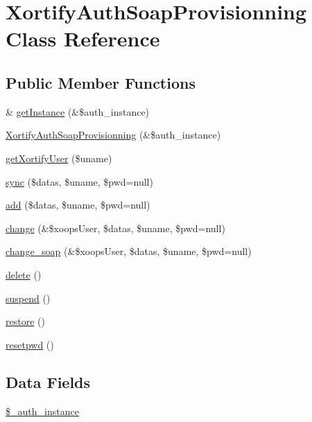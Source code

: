 \hypertarget{class_xortify_auth_soap_provisionning}{\section{Xortify\-Auth\-Soap\-Provisionning Class Reference}
\label{class_xortify_auth_soap_provisionning}
}
\subsection*{Public Member Functions}
\begin{DoxyCompactItemize}
\item 
\& \hyperlink{class_xortify_auth_soap_provisionning_a2c8eaa915c70d75289ac8a03686194f9}{get\-Instance} (\&\$auth\-\_\-instance)
\item 
\hyperlink{class_xortify_auth_soap_provisionning_a8b92f1ad88521a50ccad3531e57bafef}{Xortify\-Auth\-Soap\-Provisionning} (\&\$auth\-\_\-instance)
\item 
\hyperlink{class_xortify_auth_soap_provisionning_a041d726ac26672547ed1504e8e0117aa}{get\-Xortify\-User} (\$uname)
\item 
\hyperlink{class_xortify_auth_soap_provisionning_a35dc08b0f2138eb818ff95345b73bcff}{sync} (\$datas, \$uname, \$pwd=null)
\item 
\hyperlink{class_xortify_auth_soap_provisionning_adfc9fcef01e7bd7b2f47e8e79d51fc63}{add} (\$datas, \$uname, \$pwd=null)
\item 
\hyperlink{class_xortify_auth_soap_provisionning_ae1f0971b9712c794620cf309164e43af}{change} (\&\$xoops\-User, \$datas, \$uname, \$pwd=null)
\item 
\hyperlink{class_xortify_auth_soap_provisionning_a6b0d41baa32408f3442dfcfaf7cdc786}{change\-\_\-soap} (\&\$xoops\-User, \$datas, \$uname, \$pwd=null)
\item 
\hyperlink{class_xortify_auth_soap_provisionning_a13bdffdd926f26b825ea57066334ff01}{delete} ()
\item 
\hyperlink{class_xortify_auth_soap_provisionning_ad73006a505121228f3b075c2409787d2}{suspend} ()
\item 
\hyperlink{class_xortify_auth_soap_provisionning_aa1371f22826cf8cde4454c9b467203d0}{restore} ()
\item 
\hyperlink{class_xortify_auth_soap_provisionning_a06d70fbd3a2db390b6f2530c0076628e}{resetpwd} ()
\end{DoxyCompactItemize}
\subsection*{Data Fields}
\begin{DoxyCompactItemize}
\item 
\hyperlink{class_xortify_auth_soap_provisionning_a486ed878bb5a7188c99ac4c9ee46ac6e}{\$\-\_\-auth\-\_\-instance}
\end{DoxyCompactItemize}


